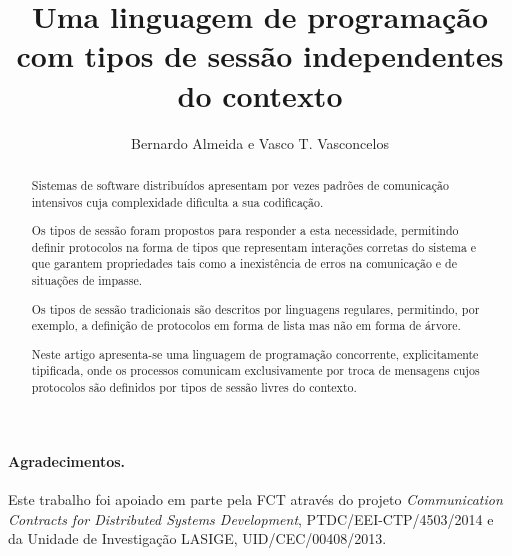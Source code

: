 \documentclass[runningheads]{llncs}
\title{Uma linguagem de programação com tipos de sessão independentes do contexto}
\author{Bernardo Almeida e Vasco T. Vasconcelos}
\institute{LASIGE, Faculdade de Ciências, Universidade de Lisboa, Portugal}
\begin{document}
\maketitle

\begin{abstract}

  Sistemas de software distribuídos apresentam por vezes padrões de
  comunicação intensivos cuja complexidade dificulta a sua
  codificação.
  
  Os tipos de sessão foram propostos para responder a esta
  necessidade, permitindo definir protocolos na forma de tipos que
  representam interações corretas do sistema e que garantem
  propriedades tais como a inexistência de erros na comunicação e de
  situações de impasse.
  
  Os tipos de sessão tradicionais são descritos por linguagens
  regulares, permitindo, por exemplo, a definição de protocolos em
  forma de lista mas não em forma de árvore.

  Neste artigo apresenta-se uma linguagem de programação concorrente,
  explicitamente tipificada, onde os processos comunicam
  exclusivamente por troca de mensagens cujos protocolos são definidos
  por tipos de sessão livres do contexto.


\end{abstract}






\paragraph{Agradecimentos.}

Este trabalho foi apoiado em parte pela FCT através do projeto
\emph{Communication Contracts for Distributed Systems Development},
PTDC/EEI-CTP/4503/2014 e da Unidade de Investigação LASIGE,
UID/CEC/00408/2013.

\end{document}
